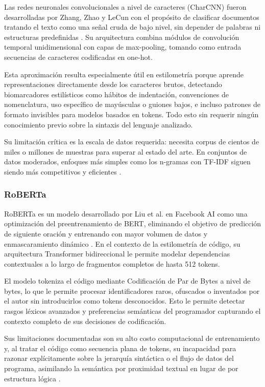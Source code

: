 Las redes neuronales convolucionales a nivel de caracteres (CharCNN) fueron 
desarrolladas por Zhang, Zhao y LeCun con el propósito de clasificar documentos 
tratando el texto como una señal cruda de bajo nivel, sin depender de palabras 
ni estructuras predefinidas \cite{Zhang2015CharCNN}. Su arquitectura combina 
módulos de convolución temporal unidimensional con capas de max-pooling, tomando 
como entrada secuencias de caracteres codificadas en one-hot.

Esta aproximación resulta especialmente útil en estilometría porque aprende 
representaciones directamente desde los caracteres brutos, detectando 
biomarcadores estilísticos como hábitos de indentación, convenciones de 
nomenclatura, uso específico de mayúsculas o guiones bajos, e incluso patrones 
de formato invisibles para modelos basados en tokens. Todo esto sin requerir 
ningún conocimiento previo sobre la sintaxis del lenguaje analizado.

Su limitación crítica es la escala de datos requerida: necesita corpus de 
cientos de miles o millones de muestras para superar al estado del arte. En 
conjuntos de datos moderados, enfoques más simples como los n-gramas con 
TF-IDF siguen siendo más competitivos y eficientes \cite{Zhang2015CharCNN}.

\subsubsection{RoBERTa}

RoBERTa es un modelo desarrollado por Liu et al. en Facebook AI como una 
optimización del preentrenamiento de BERT, eliminando el objetivo de predicción 
de siguiente oración y entrenando con mayor volumen de datos y enmascaramiento 
dinámico \cite{Liu2019RoBERTa}. En el contexto de la estilometría de código, 
su arquitectura Transformer bidireccional le permite modelar dependencias 
contextuales a lo largo de fragmentos completos de hasta 512 tokens.

El modelo tokeniza el código mediante Codificación de Par de Bytes a nivel de 
bytes, lo que le permite procesar identificadores raros, ofuscados o inventados 
por el autor sin introducirlos como tokens desconocidos. Esto le permite detectar 
rasgos léxicos avanzados y preferencias semánticas del programador capturando 
el contexto completo de sus decisiones de codificación.

Sus limitaciones documentadas son su alto costo computacional de entrenamiento y, al tratar el código como secuencia plana de tokens, su incapacidad para razonar explícitamente sobre la jerarquía sintáctica o el flujo de datos del programa, asimilando la semántica por proximidad textual en lugar de por estructura lógica \cite{Liu2019RoBERTa}.

